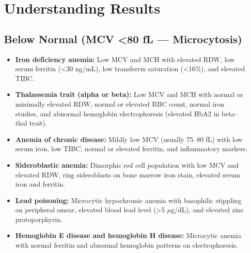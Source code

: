 \section*{Understanding Results}

\subsection*{Below Normal (MCV <80 fL --- Microcytosis)}
\begin{itemize}
  \item \textbf{Iron deficiency anemia:} Low MCV and MCH with elevated RDW, low serum ferritin (<30 ng/mL), low transferrin saturation (<16\%), and elevated TIBC.
  \item \textbf{Thalassemia trait (alpha or beta):} Low MCV and MCH with normal or minimally elevated RDW, normal or elevated RBC count, normal iron studies, and abnormal hemoglobin electrophoresis (elevated HbA2 in beta-thal trait).
  \item \textbf{Anemia of chronic disease:} Mildly low MCV (usually 75--80 fL) with low serum iron, low TIBC, normal or elevated ferritin, and inflammatory markers.
  \item \textbf{Sideroblastic anemia:} Dimorphic red cell population with low MCV and elevated RDW, ring sideroblasts on bone marrow iron stain, elevated serum iron and ferritin.
  \item \textbf{Lead poisoning:} Microcytic hypochromic anemia with basophilic stippling on peripheral smear, elevated blood lead level (>5 $\mu$g/dL), and elevated zinc protoporphyrin.
  \item \textbf{Hemoglobin E disease and hemoglobin H disease:} Microcytic anemia with normal ferritin and abnormal hemoglobin patterns on electrophoresis.
\end{itemize}

